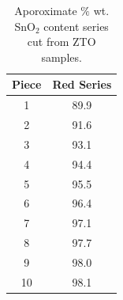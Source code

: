 \documentclass{article}
\begin{document}
\begin{table}[p]
\caption{Aporoximate $\%$ wt. SnO$_2$ content series cut from ZTO samples.}
\centering
\begin{tabular}{c c }
\hline\hline
Piece & Red Series  \\ [0.5ex]
\hline
1 & 89.9  \\
2 & 91.6   \\
3 & 93.1  \\
4 & 94.4   \\
5 & 95.5  \\
6 & 96.4   \\
7 & 97.1   \\
8 & 97.7   \\
9 & 98.0  \\
10 & 98.1   \\
\hline
\end{tabular}
\label{table:nonlin}
\end{table}
\end{document}
